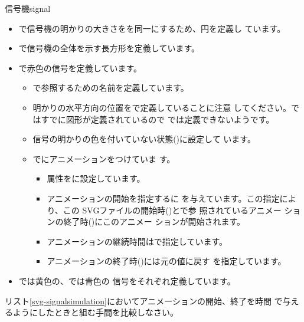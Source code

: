 {信号機}{signal} 
{}
\begin{itemize}
 \item {}で信号機の明かりの大きさをを同一にするため、円を定義し
       ています。
 \item {}で信号機の全体を示す長方形を定義しています。
 \item {}で赤色の信号を定義しています。
\begin{itemize}
 \item {}で参照するための名前を定義しています。
 \item 明かりの水平方向の位置をで定義していることに注意
       してください。ではすでに図形が定義されているので
       では定義できないようです。
 \item 信号の明かりの色を付いていない状態()に設定して
       います。
 \item {}でにアニメーションをつけていま
       す。
\begin{itemize}
 \item 属性をに設定しています。
 \item アニメーションの開始を指定するに
       を与えています。この指定により、この
       SVGファイルの開始時()とで参
       照されているアニメー ションの終了時()にこのアニメー
       ションが開始されます。
 \item アニメーションの継続時間はで指定しています。
 \item アニメーションの終了時()には元の値に戻す
       を指定しています。
\end{itemize}
\end{itemize}
 \item {}では黄色の、では青色の
       信号をそれぞれ定義しています。
\end{itemize}
\begin{Problem}\upshape
リスト\ref{svg-signalsimulation}においてアニメーションの開始、終了を時間
 で与えるようにしたときと組む手間を比較しなさい。
\end{Problem}
%
